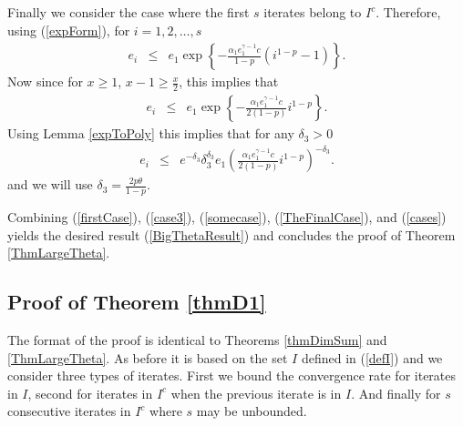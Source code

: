 Finally we consider the case where the first $s$ iterates belong to $I^c$. Therefore, using (\ref{expForm}), for $i=1,2,\ldots, s$
\begin{eqnarray}
e_{i}
&\leq&
e_{1}
\exp
\left\{-\frac{\alpha_1 e_{1}^{\gamma-1} c}{1-p}\left(i^{1-p}-1\right)
\right\}.\label{firstI2}
\end{eqnarray}
Now since for $x\geq 1$, $x-1\geq \frac{x}{2}$, this implies that
\begin{eqnarray*}
e_{i}
&\leq&
e_{1}
\exp
\left\{-\frac{\alpha_1 e_{1}^{\gamma-1} c}{2(1-p)}i^{1-p}
\right\}.
\end{eqnarray*}
Using Lemma \ref{expToPoly} this implies that for any $\delta_3>0$
\begin{eqnarray}
e_{i}\label{cases}
&\leq&
e^{-\delta_3}\delta_3^{\delta_3}
e_{1}
\left(\frac{\alpha_1 e_{1}^{\gamma-1} c}{2(1-p)}i^{1-p}
\right)^{-\delta_3}.
\end{eqnarray}
and we will use $\delta_3=\frac{2p\theta}{1-p}$.

Combining (\ref{firstCase}), (\ref{case3}), (\ref{somecase}), (\ref{TheFinalCase}), and (\ref{cases}) yields the desired result (\ref{BigThetaResult}) and concludes the proof of Theorem \ref{ThmLargeTheta}.
 
\subsection{Proof of Theorem \ref{thmD1}}

The format of the proof is identical to Theorems \ref{thmDimSum} and \ref{ThmLargeTheta}. As before it is based on the set $I$ defined in (\ref{defI}) and we consider three types of iterates. First we bound the convergence rate for iterates in $I$, second for iterates in $I^c$ when the previous iterate is in $I$. And finally for $s$ consecutive iterates in $I^c$ where $s$ may be unbounded. 

